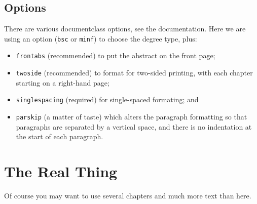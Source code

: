 \documentclass[bsc,frontabs,twoside,singlespacing,parskip,deptreport]{infthesis}
\begin{document}
{  \section{Options}{
    There are various documentclass options, see the documentation.  Here we are
    using an option ({\tt bsc} or {\tt minf}) to choose the degree type, plus:
    \begin{itemize}
    \item {\tt frontabs} (recommended) to put the abstract on the front page;
    \item {\tt twoside} (recommended) to format for two-sided printing, with
      each chapter starting on a right-hand page;
    \item {\tt singlespacing} (required) for single-spaced formating; and
    \item {\tt parskip} (a matter of taste) which alters the paragraph formatting so that
    paragraphs are separated by a vertical space, and there is no
    indentation at the start of each paragraph.
    \end{itemize}
  }
}
\chapter{The Real Thing}{
  Of course
  you may want to use several chapters and much more text than here.
}
\end{document}
